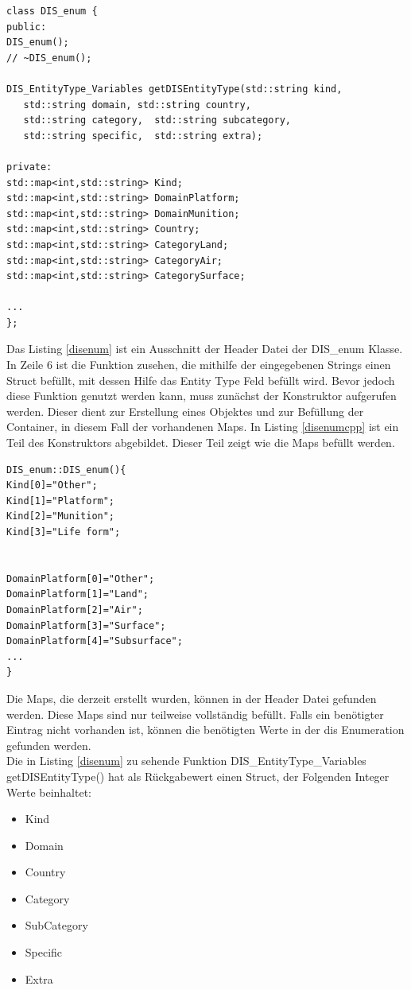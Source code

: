 \begin{lstlisting}[caption = Ausschnitt DIS\_enum.h  ,label= disenum]
class DIS_enum {
public:
DIS_enum();
// ~DIS_enum();

DIS_EntityType_Variables getDISEntityType(std::string kind,
   std::string domain, std::string country,
   std::string category,  std::string subcategory, 
   std::string specific,  std::string extra);

private:
std::map<int,std::string> Kind;
std::map<int,std::string> DomainPlatform;
std::map<int,std::string> DomainMunition;
std::map<int,std::string> Country;
std::map<int,std::string> CategoryLand;
std::map<int,std::string> CategoryAir;
std::map<int,std::string> CategorySurface;

...
};
\end{lstlisting}
Das Listing \ref{disenum} ist ein Ausschnitt der Header Datei der \glqq DIS\_enum \grqq{} Klasse. In Zeile 6 ist die Funktion zusehen, die mithilfe der eingegebenen Strings einen Struct befüllt, mit dessen Hilfe das   \glqq Entity Type \grqq{} Feld befüllt wird. Bevor jedoch diese Funktion genutzt werden kann, muss zunächst der Konstruktor aufgerufen werden. Dieser dient zur Erstellung eines Objektes und zur Befüllung der Container, in diesem Fall der vorhandenen Maps. In Listing \ref{disenumcpp} ist ein Teil des Konstruktors abgebildet. Dieser Teil zeigt wie die Maps befüllt werden.
 \begin{lstlisting}[caption = Ausschnitt DIS\_enum.cpp  ,label= disenumcpp]
DIS_enum::DIS_enum(){
Kind[0]="Other";
Kind[1]="Platform";
Kind[2]="Munition";
Kind[3]="Life form";
 
 
DomainPlatform[0]="Other";
DomainPlatform[1]="Land";
DomainPlatform[2]="Air";
DomainPlatform[3]="Surface";
DomainPlatform[4]="Subsurface";
...
}
 \end{lstlisting}
 Die Maps, die derzeit erstellt wurden, können in der Header Datei gefunden werden. Diese Maps sind nur teilweise vollständig befüllt. Falls ein benötigter Eintrag nicht vorhanden ist, können die benötigten Werte in der \ac{dis} Enumeration \cite{Shanks.} gefunden werden. \\ \newpage
 Die in Listing \ref{disenum} zu sehende Funktion \glqq DIS\_EntityType\_Variables getDISEntityType()\grqq{} 
hat als Rückgabewert einen Struct, der Folgenden Integer Werte beinhaltet: 
\begin{itemize}
	\singlespacing
	\item Kind
	\item Domain
	\item Country
	\item Category
	\item SubCategory
	\item Specific
	\item Extra
\end{itemize}
